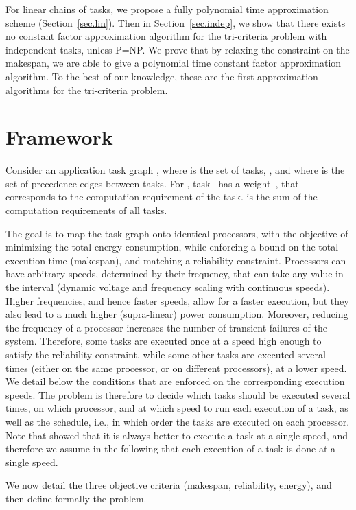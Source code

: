 \documentclass[a4paper]{article}
\theoremstyle{plain}
\theoremstyle{definition}
\theoremstyle{remark}
\begin{document}
For linear chains of tasks, we propose a fully polynomial time
approximation scheme (Section~\ref{sec.lin}). Then in
Section~\ref{sec.indep}, we show that there exists no constant factor
approximation algorithm for the tri-criteria problem with independent
tasks, unless P=NP. We prove that by relaxing the constraint on
the makespan, we are able to give a polynomial time constant factor
approximation algorithm.  To the best of our knowledge, these are the
first approximation algorithms for the tri-criteria problem. 


\section{Framework}
    \label{sec.fw}
Consider an application task graph ,
where  is the set of tasks, ,
and where  is the set of precedence edges between tasks. For , task~ has a weight~, that corresponds to the
computation requirement of the task.   is the
sum of the computation requirements of all tasks.

The goal is to map the task graph onto  identical processors, with
the objective of minimizing the total energy consumption, while
enforcing a bound on the total execution time (makespan), and matching
a reliability constraint. Processors can have arbitrary speeds,
determined by their frequency, that can take any value in the interval
 (dynamic voltage and frequency scaling with continuous
speeds). Higher frequencies, and hence faster speeds, allow for a
faster execution, but they also lead to a much higher (supra-linear)
power consumption.  Moreover, reducing the frequency of a processor
increases the number of transient failures of the system. Therefore,
some tasks are executed once at a speed high enough to satisfy the
reliability constraint, while some other tasks are executed several
times (either on the same processor, or on different processors), at a
lower speed. We detail below the conditions that are enforced on the
corresponding execution speeds. The problem is therefore to decide
which tasks should be executed several times, on which processor, and
at which speed to run each execution of a task, as well as the
schedule, i.e., in which order the tasks are executed on each
processor.  Note that \cite{rr7757} showed that it is always better
to execute a task at a single speed, and therefore we assume in the
following that each execution of a task is done at a single speed.

We now detail the three objective criteria (makespan, reliability,
energy), and then define formally the problem.
\end{document}
